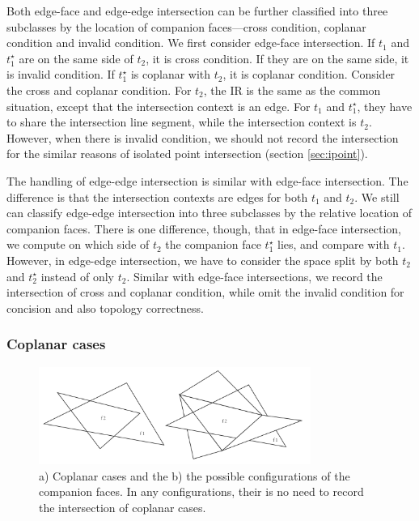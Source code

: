 \documentclass[10pt,journal,compsoc]{IEEEtran}
\begin{document}
Both edge-face and edge-edge intersection can be further classified into three subclasses by the location of companion faces---cross condition, coplanar condition and invalid condition. We first consider edge-face intersection. If $t_1$ and $t_1^\star$ are on the same side of $t_2$, it is cross condition. If they are on the same side, it is invalid condition. If $t_1^\star$ is coplanar with $t_2$, it is coplanar condition. Consider the cross and coplanar condition. For $t_2$, the IR is the same as the common situation, except that the intersection context is an edge. For $t_1$ and $t_1^\star$, they have to share the intersection line segment, while the intersection context is $t_2$.  However, when there is invalid condition, we should not record the intersection for the similar reasons of isolated point intersection (section \ref{sec:ipoint}).

The handling of edge-edge intersection is similar with edge-face intersection. The difference is that the intersection contexts are edges for both $t_1$ and $t_2$. We still can classify edge-edge intersection into three subclasses by the relative location of companion faces. There is one difference, though, that in edge-face intersection, we compute on which side of $t_2$ the companion face $t_1^\star$ lies, and compare with $t_1$. However, in edge-edge intersection, we have to consider the space split by both $t_2$ and $t_2^\star$ instead of only $t_2$.  Similar with edge-face intersections, we record the intersection of cross and coplanar condition, while omit the invalid condition for concision and also topology correctness.

\subsubsection{Coplanar cases}

\begin{figure}[t]
\centering
\includegraphics[width=3.5in]{coplanar}
\caption{a) Coplanar cases and the b) the possible configurations of the companion faces. In any configurations, their is no need to record the intersection of coplanar cases.}
\label{fig:coplanar}
\end{figure}
\end{document}
